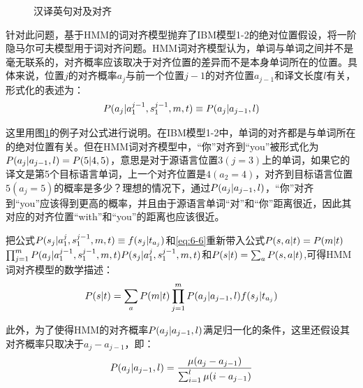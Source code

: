 \begin{figure}[htp]
    \centering

    \caption{汉译英句对及对齐}
    \label{fig:6-4}
\end{figure}

\parinterval 针对此问题，基于HMM的词对齐模型抛弃了IBM模型1-2的绝对位置假设，将一阶隐马尔可夫模型用于词对齐问题。HMM词对齐模型认为，单词与单词之间并不是毫无联系的，对齐概率应该取决于对齐位置的差异而不是本身单词所在的位置。具体来说，位置$j$的对齐概率$a_j$与前一个位置$j-1$的对齐位置$a_{j-1}$和译文长度$l$有关，形式化的表述为：
\begin{eqnarray}
{P}(a_{j}|a_{1}^{j-1},s_{1}^{j-1},m,{t})\equiv{P}(a_{j}|a_{j-1},l)
\label{eq:6-6}
\end{eqnarray}

\parinterval 这里用图\ref{fig:6-4}的例子对公式进行说明。在IBM模型1-2中，单词的对齐都是与单词所在的绝对位置有关。但在HMM词对齐模型中，“你”对齐到“you”被形式化为${P}(a_{j}|a_{j-1},l)= P(5|4,5)$，意思是对于源语言位置$3(j=3)$上的单词，如果它的译文是第5个目标语言单词，上一个对齐位置是$4(a_{2}=4)$，对齐到目标语言位置$5(a_{j}=5)$的概率是多少？理想的情况下，通过${P}(a_{j}|a_{j-1},l)$，“你”对齐到“you”应该得到更高的概率，并且由于源语言单词“对”和“你”距离很近，因此其对应的对齐位置“with”和“you”的距离也应该很近。

\parinterval 把公式${P}(s_j|a_1^{j},s_1^{j-1},m,{t}) \equiv f(s_j|t_{a_j})$和\eqref{eq:6-6}重新带入公式${P}({s},{a}|{t})={P}(m|{t})$\\$\prod_{j=1}^{m}{{P}(a_j|a_1^{j-1},s_1^{j-1},m,{t}){P}(s_j|a_1^{j},s_1^{j-1},m,{t})}$和${P}({s}|{t})= \sum_{{a}}{P}({s},{a}|{t})$,可得HMM词对齐模型的数学描述：
\begin{eqnarray}
{P}({s}| {t})=\sum_{{a}}{{P}(m|{t})}\prod_{j=1}^{m}{{P}(a_{j}|a_{j-1},l)f(s_{j}|t_{a_j})}
\label{eq:6-7}
\end{eqnarray}

\parinterval 此外，为了使得HMM的对齐概率${P}(a_{j}|a_{j-1},l)$满足归一化的条件，这里还假设其对齐概率只取决于$a_{j}-a_{j-1}$，即：
\begin{eqnarray}
{P}(a_{j}|a_{j-1},l)=\frac{\mu(a_{j}-a_{j-1})}{\sum_{i=1}^{l}{\mu(i-a_{j-1})}}
\label{eq:6-8}
\end{eqnarray}

